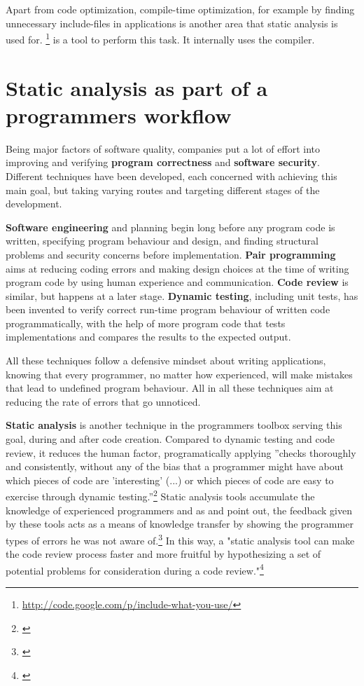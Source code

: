 Apart from code optimization, compile-time optimization, for example by finding unnecessary include-files in  applications is another area that static analysis is used for. \footnote{\url{http://code.google.com/p/include-what-you-use/}} is a tool to perform this task. It internally uses the  compiler.

\section{Static analysis as part of a programmers workflow}

Being major factors of software quality, companies put a lot of effort into improving and verifying \textbf{program correctness} and \textbf{software security}. Different techniques have been developed, each concerned with achieving this main goal, but taking varying routes and targeting different stages of the development.

\textbf{Software engineering} and planning begin long before any program code is written, specifying program behaviour and design, and finding structural problems and security concerns before implementation. \textbf{Pair programming} aims at reducing coding errors and making design choices at the time of writing program code by using human experience and communication. \textbf{Code review} is similar, but happens at a later stage. \textbf{Dynamic testing}, including unit tests, has been invented to verify correct run-time program behaviour of written code programmatically, with the help of more program code that tests implementations and compares the results to the expected output.

All these techniques follow a defensive mindset about writing applications, knowing that every programmer, no matter how experienced, will make mistakes that lead to undefined program behaviour. All in all these techniques aim at reducing the rate of errors that go unnoticed.

\textbf{Static analysis} is another technique in the programmers toolbox serving this goal, during and after code creation. Compared to dynamic testing and code review, it reduces the human factor, programatically applying ''checks thoroughly and consistently, without any of the bias that a programmer might have about which pieces of code are 'interesting' (...) or which pieces of code are easy to exercise through dynamic testing.''\footnote{\citep[22]{SecureProgramming}} Static analysis tools accumulate the knowledge of experienced programmers and as  and  point out, the feedback given by these tools acts as a means of knowledge transfer by showing the programmer types of errors he was not aware of.\footnote{\citep[22]{SecureProgramming}} In this way, a "static analysis tool can make the code review process faster and more fruitful by hypothesizing a set of potential problems for consideration during a code review."\footnote{\citep[13]{SecureProgramming}}

